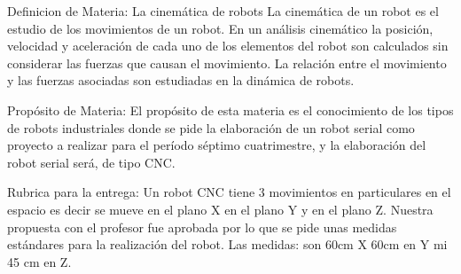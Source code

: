 \documentclass[10pt,stdletter,dateno,sigleft]{newlfm}
\date\\[20 de Septiembre del 2019] %
\begin{document}
\date{20 de septiembre 2019}
\begin{newlfm}


Definicion de Materia: La cinemática de robots La cinemática de un robot es el estudio de los movimientos de un robot. En un análisis cinemático la posición, velocidad y aceleración de cada uno de los elementos del robot son calculados sin considerar las fuerzas que causan el movimiento. La relación entre el movimiento y las fuerzas asociadas son estudiadas en la dinámica de robots.

Propósito de Materia: El propósito de esta materia es el conocimiento de los tipos de robots industriales donde se pide la elaboración de un robot serial como proyecto a realizar para el período séptimo cuatrimestre, y la elaboración del robot serial será, de tipo CNC. 
 
Rubrica para la entrega: Un robot CNC tiene 3 movimientos en particulares en el espacio es decir se mueve en el plano X en el plano Y y en el plano Z. Nuestra propuesta con el profesor fue aprobada por lo que se pide unas medidas estándares para la realización del robot. Las medidas: son 60cm X 60cm en Y mi 45 cm en Z. 


\end{newlfm}
\newpage

\end{document}
